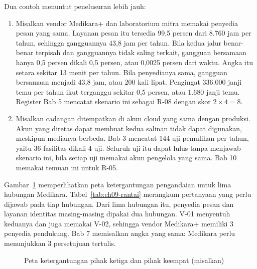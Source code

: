 Dua contoh menuntut penelusuran lebih jauh:
\begin{enumerate}
  \item Misalkan vendor Medikara+ dan laboratorium mitra memakai penyedia pesan yang sama.
  Layanan pesan itu tersedia 99,5 persen dari 8.760 jam per tahun, sehingga gangguannya 43,8 jam
  per tahun. Bila kedua jalur benar-benar terpisah dan gangguannya tidak saling terkait, gangguan
  bersamaan hanya 0,5 persen dikali 0,5 persen, atau 0,0025 persen dari waktu. Angka itu setara
  sekitar 13 menit per tahun. Bila penyedianya sama, gangguan bersamaan menjadi 43,8 jam, atau
  200 kali lipat. Pengingat 336.000 janji temu per tahun ikut terganggu sekitar 0,5 persen, atau
  1.680 janji temu. Register Bab 5 mencatat skenario ini sebagai R-08 dengan skor
  $2 \times 4 = 8$.
  \item Misalkan cadangan ditempatkan di akun cloud yang sama dengan produksi. Akun yang diretas
  dapat membuat kedua salinan tidak dapat digunakan, meskipun medianya berbeda. Bab 3 mencatat
  144 uji pemulihan per tahun, yaitu 36 fasilitas dikali 4 uji. Seluruh uji itu dapat lulus tanpa
  menjawab skenario ini, bila setiap uji memakai akun pengelola yang sama. Bab 10 memakai temuan
  ini untuk R-05.
\end{enumerate}

Gambar~\ref{fig:ch09-peta} memperlihatkan peta ketergantungan pengandaian untuk lima hubungan
Medikara. Tabel~\ref{tab:ch09-rantai} merangkum pertanyaan yang perlu dijawab pada tiap hubungan.
Dari lima hubungan itu, penyedia pesan dan layanan identitas masing-masing dipakai dua hubungan.
V-01 menyentuh keduanya dan juga memakai V-02, sehingga vendor Medikara+ memiliki 3 penyedia
pendukung. Bab 7 memisalkan angka yang sama: Medikara perlu menunjukkan 3 persetujuan tertulis.

\begin{figure}[!htb]
  \centering
  
  \caption{Peta ketergantungan pihak ketiga dan pihak keempat (misalkan)}
  \label{fig:ch09-peta}
\end{figure}

